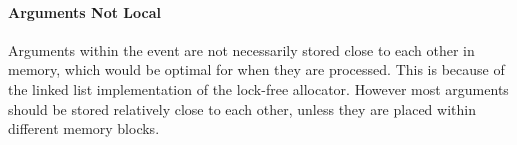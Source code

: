 \paragraph{Arguments Not Local}
Arguments within the event are not necessarily stored close to each other in memory,
which would be optimal for when they are processed. This is because of the linked list
implementation of the lock-free allocator.
However most arguments should be stored relatively close to each other, unless they are
placed within different memory blocks.
